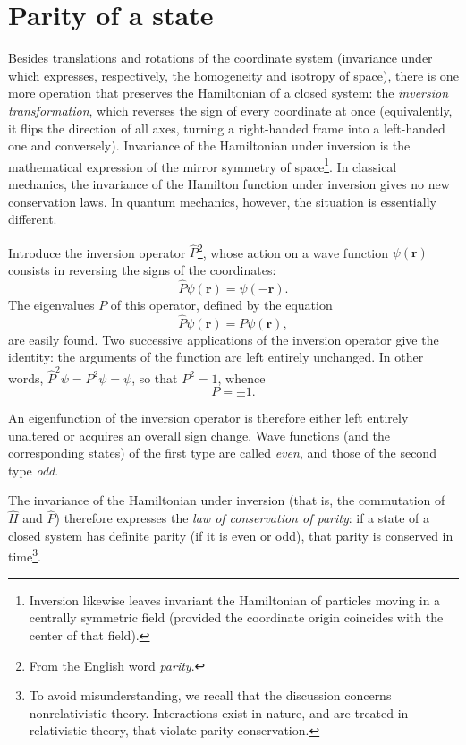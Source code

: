 \section{Parity of a state}

Besides translations and rotations of the coordinate system (invariance under
which expresses, respectively, the homogeneity and isotropy of space),
there is one more operation that preserves the Hamiltonian of a closed
system: the \emph{inversion transformation}, which reverses the sign of
every coordinate at once (equivalently, it flips the direction of all
axes, turning a right-handed frame into a left-handed one and
conversely). Invariance of the Hamiltonian under inversion is the
mathematical expression of the mirror symmetry of space\footnote{Inversion
likewise leaves invariant the Hamiltonian of particles moving in a centrally
symmetric field (provided the coordinate origin coincides with the center of
that field).}. In classical
mechanics, the invariance of the Hamilton function under inversion gives no
new conservation laws. In quantum mechanics, however, the situation is
essentially different.

Introduce the inversion operator $\hat P$\footnote{From the English word
\emph{parity}.}, whose action on a wave function $\psi(\mathbf r)$ consists
in reversing the signs of the coordinates:
\begin{equation}
  \hat P\psi(\mathbf r)=\psi(-\mathbf r).
  \tag{30.1}
\end{equation}
The eigenvalues $P$ of this operator, defined by the equation
\begin{equation}
  \hat P\psi(\mathbf r)=P\psi(\mathbf r),
  \tag{30.2}
\end{equation}
are easily found. Two successive applications of the inversion operator give
the identity: the arguments of the function are left entirely unchanged. In
other words, $\hat P^2\psi=P^2\psi=\psi$, so that $P^2=1$, whence
\begin{equation}
  P=\pm1.
  \tag{30.3}
\end{equation}

An eigenfunction of the inversion operator is therefore either left entirely
unaltered or acquires an overall sign change. Wave functions (and the
corresponding states) of the first type are called \emph{even}, and those
of the second type \emph{odd}.

The invariance of the Hamiltonian under inversion (that is, the commutation of
$\hat H$ and $\hat P$) therefore expresses the \emph{law of conservation of
parity}: if a state of a closed system has definite parity (if it is even or
odd), that parity is conserved in time\footnote{To avoid misunderstanding, we
recall that the discussion concerns nonrelativistic theory. Interactions exist
in nature, and are treated in relativistic theory, that violate parity
conservation.}.

